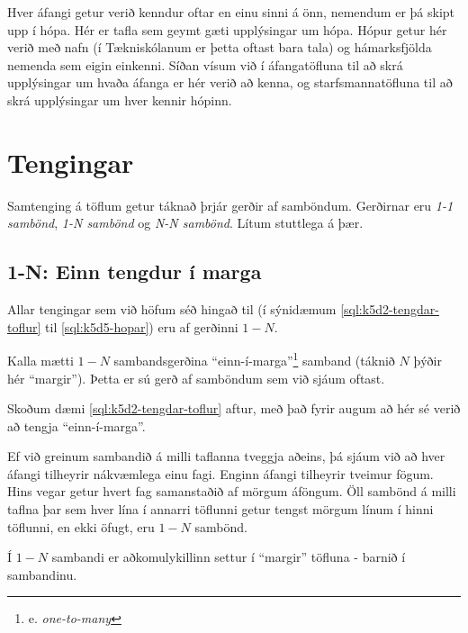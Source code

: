 \begin{example}
\caption[Hópar]{Hver áfangi getur verið kenndur oftar en einu sinni á önn, nemendum er þá skipt upp í hópa. Hér er tafla sem geymt gæti upplýsingar um hópa. Hópur getur hér verið með nafn (í Tækniskólanum er þetta oftast bara tala) og hámarksfjölda nemenda sem eigin einkenni. Síðan vísum við í áfangatöfluna til að skrá upplýsingar um hvaða áfanga er hér verið að kenna, og starfsmannatöfluna til að skrá upplýsingar um hver kennir hópinn.}
\label{sql:k5d5-hopar}
\centering
{}
\end{example}

\section{Tengingar} %
Samtenging á töflum getur táknað þrjár gerðir af samböndum. Gerðirnar eru \emph{1-1 sambönd}, \emph{1-N sambönd} og \emph{N-N sambönd}. Lítum stuttlega á þær.

\subsection{1-N: Einn tengdur í marga}
Allar tengingar sem við höfum séð hingað til (í sýnidæmum \ref{sql:k5d2-tengdar-toflur} til \ref{sql:k5d5-hopar}) eru af gerðinni $1-N$.

Kalla mætti $1-N$ sambandsgerðina ``einn-í-marga''\footnote{e. \emph{one-to-many}} samband (táknið $N$ þýðir hér ``margir''). Þetta er sú gerð af samböndum sem við sjáum oftast.

Skoðum dæmi \ref{sql:k5d2-tengdar-toflur} aftur, með það fyrir augum að hér sé verið að tengja ``einn-í-marga''.

Ef við greinum sambandið á milli taflanna tveggja aðeins, þá sjáum við að hver áfangi tilheyrir nákvæmlega einu fagi. Enginn áfangi tilheyrir tveimur fögum. Hins vegar getur hvert fag samanstaðið af mörgum áföngum. Öll sambönd á milli taflna þar sem hver lína í annarri töflunni getur tengst mörgum línum í hinni töflunni, en ekki öfugt, eru $1-N$ sambönd.

Í $1-N$ sambandi er aðkomulykillinn settur í ``margir'' töfluna - barnið í sambandinu.
